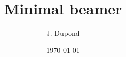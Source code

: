 \documentclass[14pt,french,aspectratio=169]{beamer}
\title{\Huge Minimal beamer}
\author{\LARGE J. Dupond}
\date{\Large \today}
\begin{document}
\maketitle
\large \tableofcontents
\normalsize


\end{document}
